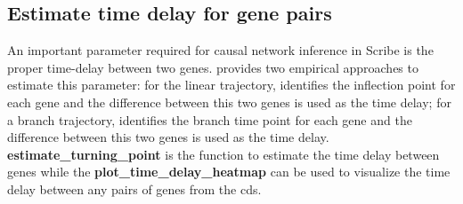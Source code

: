 \documentclass[10pt,oneside]{article}\usepackage[]{graphicx}\usepackage[]{color}
\newenvironment{knitrout}{}{} %
\begin{document}
\begin{knitrout}
{}



\end{knitrout}

\subsection{Estimate time delay for gene pairs}

An important parameter required for causal network inference in Scribe is the proper time-delay between two genes.  provides two empirical approaches to estimate this parameter: for the linear trajectory,  identifies the inflection point for each gene and the difference between this two genes is used as the time delay; for a branch trajectory,  identifies the branch time point for each gene and the difference between this two genes is used as the time delay. \textbf{estimate\_turning\_point} is the function to estimate the time delay between genes while the \textbf{plot\_time\_delay\_heatmap} can be used to visualize the time delay between any pairs of genes from the cds.
\end{document}
